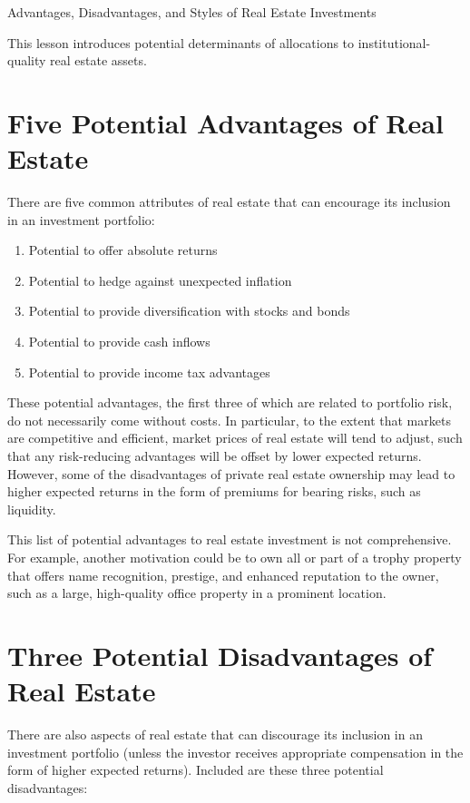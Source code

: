 \documentclass[11pt]{article}
\begin{document}
Advantages, Disadvantages, and Styles of Real Estate Investments

This lesson introduces potential determinants of allocations to institutional-quality real estate assets.

\section*{Five Potential Advantages of Real Estate}
There are five common attributes of real estate that can encourage its inclusion in an investment portfolio:

\begin{enumerate}
  \item Potential to offer absolute returns

  \item Potential to hedge against unexpected inflation

  \item Potential to provide diversification with stocks and bonds

  \item Potential to provide cash inflows

  \item Potential to provide income tax advantages

\end{enumerate}

These potential advantages, the first three of which are related to portfolio risk, do not necessarily come without costs. In particular, to the extent that markets are competitive and efficient, market prices of real estate will tend to adjust, such that any risk-reducing advantages will be offset by lower expected returns. However, some of the disadvantages of private real estate ownership may lead to higher expected returns in the form of premiums for bearing risks, such as liquidity.

This list of potential advantages to real estate investment is not comprehensive. For example, another motivation could be to own all or part of a trophy property that offers name recognition, prestige, and enhanced reputation to the owner, such as a large, high-quality office property in a prominent location.

\section*{Three Potential Disadvantages of Real Estate}
There are also aspects of real estate that can discourage its inclusion in an investment portfolio (unless the investor receives appropriate compensation in the form of higher expected returns). Included are these three potential disadvantages:
\end{document}
